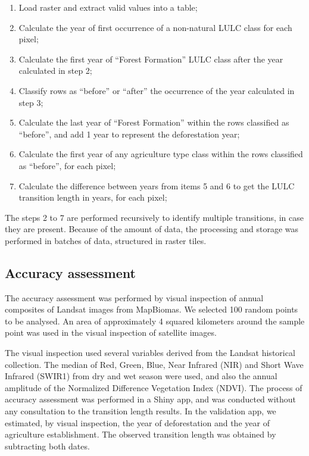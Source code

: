 \documentclass[essd, manuscript]{copernicus}
\begin{document}
\begin{enumerate}
\def\labelenumi{\arabic{enumi}.}
\item
  Load raster and extract valid values into a table;
\item
  Calculate the year of first occurrence of a non-natural LULC class for each pixel;
\item
  Calculate the first year of ``Forest Formation'' LULC class after the year calculated in step 2;
\item
  Classify rows as ``before'' or ``after'' the occurrence of the year calculated in step 3;
\item
  Calculate the last year of ``Forest Formation'' within the rows classified as ``before'', and add 1 year to represent the deforestation year;
\item
  Calculate the first year of any agriculture type class within the rows classified as ``before'', for each pixel;
\item
  Calculate the difference between years from items 5 and 6 to get the LULC transition length in years, for each pixel;
\end{enumerate}

The steps 2 to 7 are performed recursively to identify multiple transitions, in case they are present.
Because of the amount of data, the processing and storage was performed in batches of data, structured in raster tiles.

\subsection{Accuracy assessment}

The accuracy assessment was performed by visual inspection of annual composites of Landsat images from MapBiomas.
We selected 100 random points to be analysed.
An area of approximately 4 squared kilometers around the sample point was used in the visual inspection of satellite images.

The visual inspection used several variables derived from the Landsat historical collection.
The median of Red, Green, Blue, Near Infrared (NIR) and Short Wave Infrared (SWIR1) from dry and wet season were used, and also the annual amplitude of the Normalized Difference Vegetation Index (NDVI).
The process of accuracy assessment was performed in a Shiny app, and was conducted without any consultation to the transition length results.
In the validation app, we estimated, by visual inspection, the year of deforestation and the year of agriculture establishment.
The observed transition length was obtained by subtracting both dates.
\end{document}
